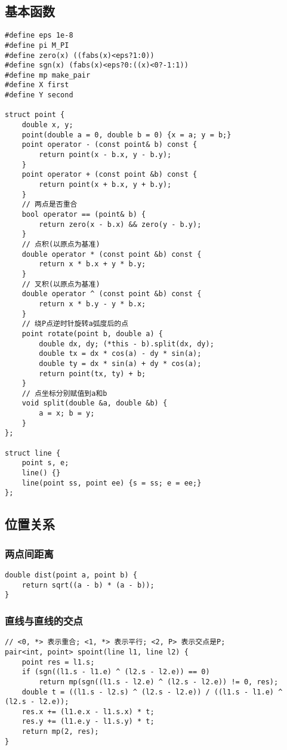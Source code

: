 \documentclass[a4paper]{article}
\begin{document}
\subsection{基本函数}
\begin{lstlisting}
#define eps 1e-8
#define pi M_PI
#define zero(x) ((fabs(x)<eps?1:0))
#define sgn(x) (fabs(x)<eps?0:((x)<0?-1:1))
#define mp make_pair
#define X first
#define Y second

struct point {
    double x, y;
    point(double a = 0, double b = 0) {x = a; y = b;}
    point operator - (const point& b) const {
        return point(x - b.x, y - b.y);
    }
    point operator + (const point &b) const {
        return point(x + b.x, y + b.y);
    }
    // 两点是否重合
    bool operator == (point& b) {
        return zero(x - b.x) && zero(y - b.y);
    }
    // 点积(以原点为基准)
    double operator * (const point &b) const {
        return x * b.x + y * b.y;
    }
    // 叉积(以原点为基准)
    double operator ^ (const point &b) const {
        return x * b.y - y * b.x;
    }
    // 绕P点逆时针旋转a弧度后的点
    point rotate(point b, double a) {
        double dx, dy; (*this - b).split(dx, dy);
        double tx = dx * cos(a) - dy * sin(a);
        double ty = dx * sin(a) + dy * cos(a);
        return point(tx, ty) + b;
    }
    // 点坐标分别赋值到a和b
    void split(double &a, double &b) {
        a = x; b = y;
    }
};

struct line {
    point s, e;
    line() {}
    line(point ss, point ee) {s = ss; e = ee;}
};
\end{lstlisting}
\subsection{位置关系}
\subsubsection{两点间距离}
\begin{lstlisting}
double dist(point a, point b) {
    return sqrt((a - b) * (a - b));
}
\end{lstlisting}
\subsubsection{直线与直线的交点}
\begin{lstlisting}
// <0, *> 表示重合; <1, *> 表示平行; <2, P> 表示交点是P;
pair<int, point> spoint(line l1, line l2) {
    point res = l1.s;
    if (sgn((l1.s - l1.e) ^ (l2.s - l2.e)) == 0)
        return mp(sgn((l1.s - l2.e) ^ (l2.s - l2.e)) != 0, res);
    double t = ((l1.s - l2.s) ^ (l2.s - l2.e)) / ((l1.s - l1.e) ^ (l2.s - l2.e));
    res.x += (l1.e.x - l1.s.x) * t;
    res.y += (l1.e.y - l1.s.y) * t;
    return mp(2, res);
}\end{lstlisting}
\end{document}
